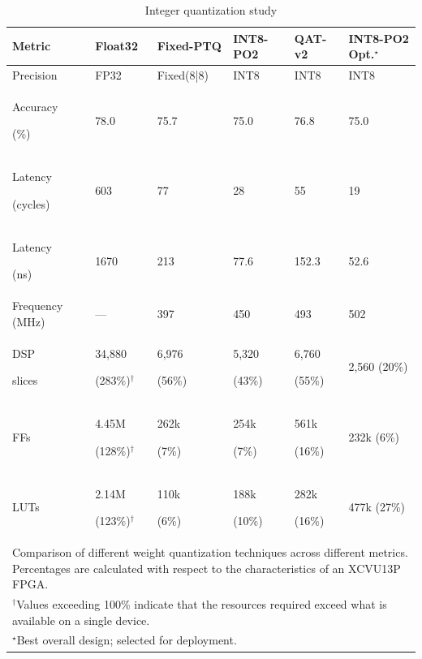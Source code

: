 \documentclass{IEEEtran}
\begin{document}
\begin{table}[htbp]
\centering
\caption{Integer quantization study}
\label{tab:quantization}
\setlength{\tabcolsep}{3pt}
\renewcommand{\arraystretch}{1.2}
\begin{tabular}{p{35pt} p{28pt}p{40pt}p{38pt}p{30pt}p{40pt}}
\hline
\textbf{Metric} & \textbf{Float32} & \textbf{Fixed-PTQ} & \textbf{INT8-PO2} & \textbf{QAT-v2} & \textbf{INT8-PO2  Opt.$^\star$} \\
\hline
Precision         & FP32  & Fixed(8|8) & INT8  & INT8  & INT8  \\
Accuracy \par(\%)     & 78.0  & 75.7  & 75.0  & 76.8  & 75.0  \\
Latency \par(cycles)  & 603   & 77    & 28    & 55    & 19    \\
Latency \par(ns)      & 1670  & 213   & 77.6  & 152.3 & 52.6  \\
Frequency (MHz)   & ---   & 397   & 450   & 493   & 502   \\
DSP\par slices        & 34,880 \par(283\%)$^\dagger$ & 6,976 \par(56\%) & 5,320 \par(43\%) & 6,760 \par(55\%) & 2,560 (20\%) \\
FFs        & 4.45M \par(128\%)$^\dagger$  & 262k \par(7\%)   & 254k \par(7\%)   & 561k \par(16\%)  & 232k (6\%)   \\
LUTs              & 2.14M \par(123\%)$^\dagger$  & 110k \par(6\%)   & 188k \par(10\%)  & 282k \par(16\%)  & 477k (27\%)  \\
\hline
\multicolumn{6}{p{240pt}}{Comparison of different weight quantization techniques across different metrics. Percentages are calculated with respect to the characteristics of an XCVU13P FPGA.}\\
\multicolumn{6}{p{240pt}}{$^\dagger$Values exceeding 100\% indicate that the resources required exceed what is available on a single device.}\\
\multicolumn{6}{p{240pt}}{$^\star$Best overall design; selected for deployment.}\\
\end{tabular}
\end{table}
\end{document}
